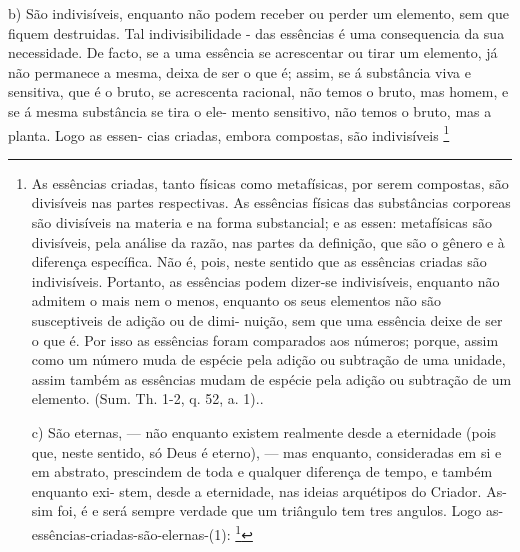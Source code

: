 \documentclass[12pt,a4paper]{article}
\newcommand{\pagmark}[1]{\quad[\textit{p.\,#1}]\quad}
\begin{document}
{{{{{{{{     \medskip\noindent b) São indivisíveis, enquanto não podem receber ou perder
 um elemento, sem que fiquem destruidas. Tal indivisibilidade
- das essências é uma consequencia da sua necessidade. De facto,
 se a uma essência se acrescentar ou tirar um elemento, já não
 permanece a mesma, deixa de ser o que é; assim, se á substância
 viva e sensitiva, que é o bruto, se acrescenta racional, não temos
 o bruto, mas homem, e se á mesma substância se tira o ele-
 mento sensitivo, não temos o bruto, mas a planta. Logo as essen-
 cias criadas, embora compostas, são indivisíveis \footnote{As essências criadas, tanto físicas como metafísicas, por serem
 compostas, são divisíveis nas partes respectivas. As essências físicas das
 substâncias corporeas são divisíveis na materia e na forma substancial; e
 as essen: metafísicas são divisíveis, pela análise da razão, nas partes
 da definição, que são o gênero e à diferença específica. Não é, pois, neste
 sentido que as essências criadas são indivisíveis. Portanto, as essências
 podem dizer-se indivisíveis, enquanto não admitem o mais nem o menos,
 enquanto os seus elementos não são susceptiveis de adição ou de dimi-
 nuição, sem que uma essência deixe de ser o que é. Por isso as essências
 foram comparados aos números; porque, assim como um número muda de
 espécie pela adição ou subtração de uma unidade, assim também as
 essências mudam de espécie pela adição ou subtração de um elemento.
(Sum. Th. 1-2, q. 52, a. 1).. 
\pagmark{309}

     \medskip\noindent c) São eternas, — não enquanto existem realmente desde
 a eternidade (pois que, neste sentido, só Deus é eterno), — mas
 enquanto, consideradas em si e em abstrato, prescindem de
 toda e qualquer diferença de tempo, e também enquanto exi-
 stem, desde a eternidade, nas ideias arquétipos do Criador. As-
 sim foi, é e será sempre verdade que um triângulo tem tres
 angulos. Logo as-essências-criadas-são-elernas-(1): \footnote{As essências criadas podêm considerar-se em si mesmas e na Jhtel-
 tigencia divina. — Consideradas em si mesmas, as essências prescindem de
 toda a limitação do tempo e do lugar. É uma eternidade negativa. — Con-
 sideradas na inteligência divina, as essências criadas são dotadas de todos
 os atributos, próprios da Divindade: porque, nesta hipótese, as essências
criadas não se distinguem realmente da Inteligência divina, nem, por isso,
 da Essência divina, mas são a própria Essência infinita, enquanto pode ser
 diversemente imitada e participada pelas criaturas.. As essências criadas,
 pois, são outras tantas participações. ainda que inadequadas,
 da única e
simplíssima Essência infinita. Esta participação não se faz por emanação,
 mas por semelhança, enquanto o efeito é semelhante à sua causa}
\pagmark{309}

}}}}}}}}}
\end{document}
